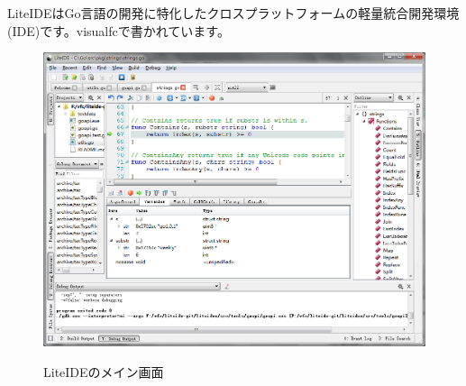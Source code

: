 LiteIDEはGo言語の開発に特化したクロスプラットフォームの軽量統合開発環境(IDE)です。visualfcで書かれています。


\begin{figure}[H]
   \includegraphics[width=14cm]{1.4.liteide.png}
   \label{図1.4}
   \caption{LiteIDEのメイン画面}
\end{figure}
